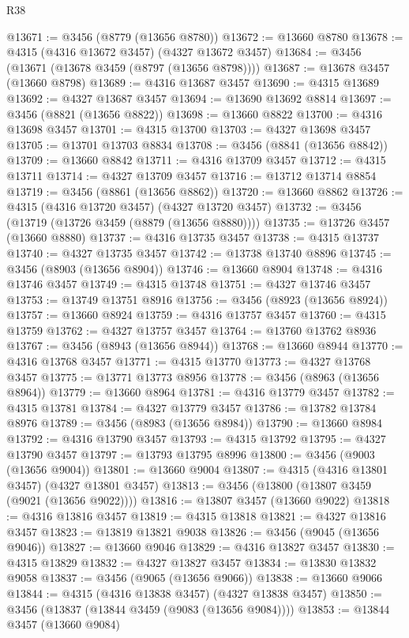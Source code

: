 \begin{lexlean}{R38}
\begin{coremodule}
@13671 := @3456 (@8779 (@13656 @8780))
@13672 := @13660 @8780
@13678 := @4315 (@4316 @13672 @3457) (@4327 @13672 @3457)
@13684 := @3456 (@13671 (@13678 @3459 (@8797 (@13656 @8798))))
@13687 := @13678 @3457 (@13660 @8798)
@13689 := @4316 @13687 @3457
@13690 := @4315 @13689
@13692 := @4327 @13687 @3457
@13694 := @13690 @13692 @8814
@13697 := @3456 (@8821 (@13656 @8822))
@13698 := @13660 @8822
@13700 := @4316 @13698 @3457
@13701 := @4315 @13700
@13703 := @4327 @13698 @3457
@13705 := @13701 @13703 @8834
@13708 := @3456 (@8841 (@13656 @8842))
@13709 := @13660 @8842
@13711 := @4316 @13709 @3457
@13712 := @4315 @13711
@13714 := @4327 @13709 @3457
@13716 := @13712 @13714 @8854
@13719 := @3456 (@8861 (@13656 @8862))
@13720 := @13660 @8862
@13726 := @4315 (@4316 @13720 @3457) (@4327 @13720 @3457)
@13732 := @3456 (@13719 (@13726 @3459 (@8879 (@13656 @8880))))
@13735 := @13726 @3457 (@13660 @8880)
@13737 := @4316 @13735 @3457
@13738 := @4315 @13737
@13740 := @4327 @13735 @3457
@13742 := @13738 @13740 @8896
@13745 := @3456 (@8903 (@13656 @8904))
@13746 := @13660 @8904
@13748 := @4316 @13746 @3457
@13749 := @4315 @13748
@13751 := @4327 @13746 @3457
@13753 := @13749 @13751 @8916
@13756 := @3456 (@8923 (@13656 @8924))
@13757 := @13660 @8924
@13759 := @4316 @13757 @3457
@13760 := @4315 @13759
@13762 := @4327 @13757 @3457
@13764 := @13760 @13762 @8936
@13767 := @3456 (@8943 (@13656 @8944))
@13768 := @13660 @8944
@13770 := @4316 @13768 @3457
@13771 := @4315 @13770
@13773 := @4327 @13768 @3457
@13775 := @13771 @13773 @8956
@13778 := @3456 (@8963 (@13656 @8964))
@13779 := @13660 @8964
@13781 := @4316 @13779 @3457
@13782 := @4315 @13781
@13784 := @4327 @13779 @3457
@13786 := @13782 @13784 @8976
@13789 := @3456 (@8983 (@13656 @8984))
@13790 := @13660 @8984
@13792 := @4316 @13790 @3457
@13793 := @4315 @13792
@13795 := @4327 @13790 @3457
@13797 := @13793 @13795 @8996
@13800 := @3456 (@9003 (@13656 @9004))
@13801 := @13660 @9004
@13807 := @4315 (@4316 @13801 @3457) (@4327 @13801 @3457)
@13813 := @3456 (@13800 (@13807 @3459 (@9021 (@13656 @9022))))
@13816 := @13807 @3457 (@13660 @9022)
@13818 := @4316 @13816 @3457
@13819 := @4315 @13818
@13821 := @4327 @13816 @3457
@13823 := @13819 @13821 @9038
@13826 := @3456 (@9045 (@13656 @9046))
@13827 := @13660 @9046
@13829 := @4316 @13827 @3457
@13830 := @4315 @13829
@13832 := @4327 @13827 @3457
@13834 := @13830 @13832 @9058
@13837 := @3456 (@9065 (@13656 @9066))
@13838 := @13660 @9066
@13844 := @4315 (@4316 @13838 @3457) (@4327 @13838 @3457)
@13850 := @3456 (@13837 (@13844 @3459 (@9083 (@13656 @9084))))
@13853 := @13844 @3457 (@13660 @9084)

\end{coremodule}
\end{lexlean}
